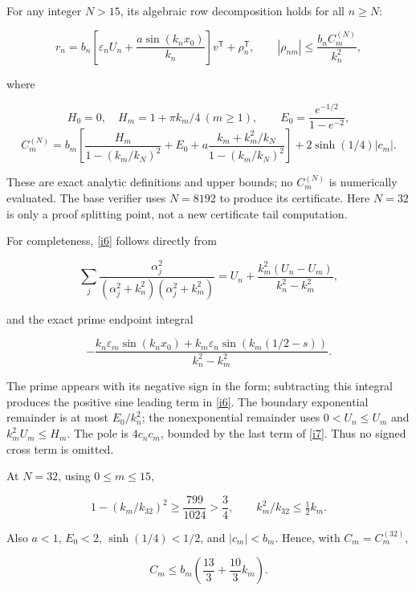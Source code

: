 \documentclass[11pt]{article}
\begin{document}
For any integer \(N>15\), its algebraic row decomposition holds for all \(n\ge N\):

\begin{equation}\label{i6}
r_n=b_n\left[\varepsilon_nU_n+
               \frac{a\sin(k_nx_0)}{k_n}\right]v^{\mathsf T}
             +\rho_n^{\mathsf T},
 \qquad |\rho_{nm}|\le\frac{b_n C_m^{(N)}}{k_n^2},
\end{equation}

where

\[
 H_0=0,\quad H_m=1+\pi k_m/4\ (m\ge1),\qquad
 E_0=\frac{e^{-1/2}}{1-e^{-2}},
\]
\begin{equation}\label{i7}
C_m^{(N)}=b_m\left[
  \frac{H_m}{1-(k_m/k_N)^2}+E_0+
  a\frac{k_m+k_m^2/k_N}{1-(k_m/k_N)^2}\right]
       +2\sinh(1/4)|c_m|.
\end{equation}

These are exact analytic definitions and upper bounds; no \(C_m^{(N)}\) is numerically evaluated. The base verifier uses \(N=8192\) to produce its certificate. Here \(N=32\) is only a proof splitting point, not a new certificate tail computation.

For completeness, \eqref{i6} follows directly from

\[
 \sum_j\frac{\alpha_j^2}
 { (\alpha_j^2+k_n^2)(\alpha_j^2+k_m^2)}
 =U_n+\frac{k_m^2(U_n-U_m)}{k_n^2-k_m^2},
\]

and the exact prime endpoint integral

\[
 -\frac{k_n\varepsilon_m\sin(k_nx_0)
          +k_m\varepsilon_n\sin(k_m(1/2-s))}{k_n^2-k_m^2}.
\]

The prime appears with its negative sign in the form; subtracting this integral produces the positive sine leading term in \eqref{i6}. The boundary exponential remainder is at most \(E_0/k_n^2\); the nonexponential remainder uses \(0<U_n\le U_m\) and \(k_m^2U_m\le H_m\). The pole is \(4c_nc_m\), bounded by the last term of \eqref{i7}. Thus no signed cross term is omitted.

At \(N=32\), using \(0\le m\le15\),

\[
 1-(k_m/k_{32})^2\ge\frac{799}{1024}>\frac34,
 \qquad k_m^2/k_{32}\le\tfrac12 k_m.
\]

Also \(a<1\), \(E_0<2\), \(\sinh(1/4)<1/2\), and \(|c_m|<b_m\). Hence, with \(C_m=C_m^{(32)}\),

\begin{equation}\label{i8}
C_m\le b_m\left(\frac{13}3+\frac{10}3 k_m\right).
\end{equation}
\end{document}
